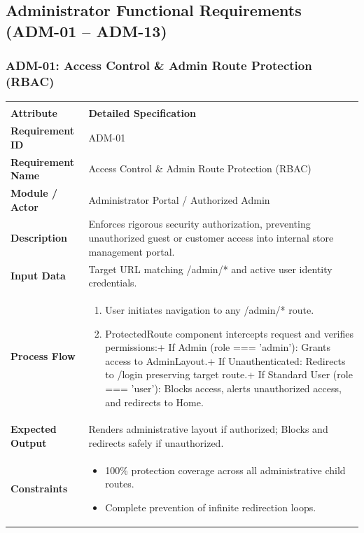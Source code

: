 \documentclass[12pt,a4paper,oneside]{report}
\begin{document}
\subsection{Administrator Functional Requirements (ADM-01 -- ADM-13)}

\subsubsection{ADM-01: Access Control \& Admin Route Protection (RBAC)}
\begin{longtable}{|p{3.6cm}|p{11.9cm}|}
\hline
\rowcolor{PrimaryBrown}
\multicolumn{2}{|p{15.5cm}|}{\textbf{\textcolor{white}{Functional Specification: ADM-01 -- Access Control \& Admin Route Protection (RBAC)}}} \\
\hline
\endfirsthead
\hline
\rowcolor{PrimaryBrown}
\multicolumn{2}{|p{15.5cm}|}{\textbf{\textcolor{white}{Functional Specification: ADM-01 (Continued)}}} \\
\hline
\textbf{Attribute} & \textbf{Detailed Specification} \\
\hline
\endhead
\hline
\endfoot
\textbf{Requirement ID} & ADM-01 \\
\hline
\textbf{Requirement Name} & Access Control \& Admin Route Protection (RBAC) \\
\hline
\textbf{Module / Actor} & Administrator Portal / Authorized Admin \\
\hline
\textbf{Description} & Enforces rigorous security authorization, preventing unauthorized guest or customer access into internal store management portal. \\
\hline
\textbf{Input Data} & Target URL matching /admin/* and active user identity credentials. \\
\hline
\textbf{Process Flow} & \begin{enumerate}[leftmargin=*,nosep,topsep=2pt]
  \item User initiates navigation to any /admin/* route.
  \item ProtectedRoute component intercepts request and verifies permissions:+ If Admin (role === 'admin'): Grants access to AdminLayout.+ If Unauthenticated: Redirects to /login preserving target route.+ If Standard User (role === 'user'): Blocks access, alerts unauthorized access, and redirects to Home.
\end{enumerate} \\
\hline
\textbf{Expected Output} & Renders administrative layout if authorized; Blocks and redirects safely if unauthorized. \\
\hline
\textbf{Constraints} & \begin{itemize}[leftmargin=*,nosep,topsep=2pt]
  \item 100\% protection coverage across all administrative child routes.
  \item Complete prevention of infinite redirection loops.
\end{itemize} \\
\hline
\end{longtable}
\end{document}
